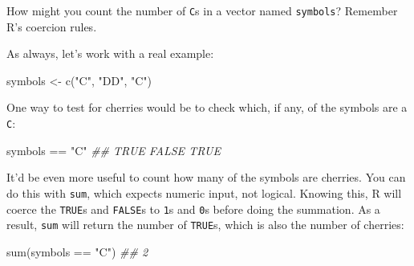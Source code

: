 \documentclass[
  letterpaper,
  DIV=11,
  numbers=noendperiod]{scrbook}
\newenvironment{Shaded}{\begin{snugshade}}{\end{snugshade}}
\newcommand{\DocumentationTok}[1]{\textcolor[rgb]{0.37,0.37,0.37}{\textit{#1}}}
\newcommand{\FunctionTok}[1]{\textcolor[rgb]{0.28,0.35,0.67}{#1}}
\newcommand{\NormalTok}[1]{\textcolor[rgb]{0.00,0.23,0.31}{#1}}
\newcommand{\OtherTok}[1]{\textcolor[rgb]{0.00,0.23,0.31}{#1}}
\newcommand{\SpecialCharTok}[1]{\textcolor[rgb]{0.37,0.37,0.37}{#1}}
\newcommand{\StringTok}[1]{\textcolor[rgb]{0.13,0.47,0.30}{#1}}
\begin{document}
\begin{tcolorbox}[enhanced jigsaw, breakable, colback=white, colbacktitle=quarto-callout-note-color!10!white, arc=.35mm, bottomrule=.15mm, coltitle=black, left=2mm, rightrule=.15mm, colframe=quarto-callout-note-color-frame, leftrule=.75mm, opacitybacktitle=0.6, bottomtitle=1mm, toptitle=1mm, titlerule=0mm, opacityback=0, title=\textcolor{quarto-callout-note-color}{\faInfo}\hspace{0.5em}{Challenge}, toprule=.15mm]

How might you count the number of \texttt{C}s in a vector named
\texttt{symbols}? Remember R's coercion rules.

\end{tcolorbox}

As always, let's work with a real example:

\begin{Shaded}
\begin{Highlighting}[]
\NormalTok{symbols }\OtherTok{\textless{}{-}} \FunctionTok{c}\NormalTok{(}\StringTok{"C"}\NormalTok{, }\StringTok{"DD"}\NormalTok{, }\StringTok{"C"}\NormalTok{)}
\end{Highlighting}
\end{Shaded}

One way to test for cherries would be to check which, if any, of the
symbols are a \texttt{C}:

\begin{Shaded}
\begin{Highlighting}[]
\NormalTok{symbols }\SpecialCharTok{==} \StringTok{"C"}
\DocumentationTok{\#\# TRUE FALSE  TRUE}
\end{Highlighting}
\end{Shaded}

It'd be even more useful to count how many of the symbols are cherries.
You can do this with \texttt{sum}, which expects numeric input, not
logical. Knowing this, R will coerce the \texttt{TRUE}s and
\texttt{FALSE}s to \texttt{1}s and \texttt{0}s before doing the
summation. As a result, \texttt{sum} will return the number of
\texttt{TRUE}s, which is also the number of cherries:

\begin{Shaded}
\begin{Highlighting}[]
\FunctionTok{sum}\NormalTok{(symbols }\SpecialCharTok{==} \StringTok{"C"}\NormalTok{)}
\DocumentationTok{\#\# 2}
\end{Highlighting}
\end{Shaded}
\end{document}
